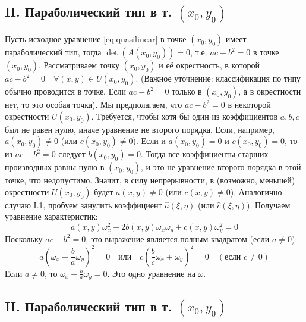 \documentclass[12pt, a4paper]{article}
\begin{document}
\subsection*{II. Параболический тип в т. $(x_0,y_0)$}
Пусть исходное уравнение \eqref{eq:quasilinear} в точке $(x_0,y_0)$ имеет параболический тип, тогда $\det(A(x_0,y_0))=0$, т.е. $ac-b^2=0$ в точке $(x_0,y_0)$.
Рассматриваем точку $(x_0,y_0)$ и её окрестность, в которой $ac-b^2=0 \quad \forall (x,y) \in U(x_0,y_0)$.
(Важное уточнение: классификация по типу обычно проводится в точке. Если $ac-b^2=0$ только в $(x_0,y_0)$, а в окрестности нет, то это особая точка).
Мы предполагаем, что $ac-b^2=0$ в некоторой окрестности $U(x_0,y_0)$.
Требуется, чтобы хотя бы один из коэффициентов $a,b,c$ был не равен нулю, иначе уравнение не второго порядка.
Если, например, $a(x_0,y_0) \neq 0$ (или $c(x_0,y_0) \neq 0$). Если и $a(x_0,y_0)=0$ и $c(x_0,y_0)=0$, то из $ac-b^2=0$ следует $b(x_0,y_0)=0$. Тогда все коэффициенты старших производных равны нулю в $(x_0,y_0)$, и это не уравнение второго порядка в этой точке, что недопустимо.
Значит, в силу непрерывности, в (возможно, меньшей) окрестности $U(x_0,y_0)$ будет $a(x,y) \neq 0$ (или $c(x,y) \neq 0$).
Аналогично случаю I.1, пробуем занулить коэффициент $\hat{a}(\xi,\eta)$ (или $\hat{c}(\xi,\eta)$).
Получаем уравнение характеристик:
\[ a(x,y)\omega_x^2 + 2b(x,y)\omega_x\omega_y + c(x,y)\omega_y^2 = 0 \]
Поскольку $ac-b^2=0$, это выражение является полным квадратом (если $a \neq 0$):
\[ a\left(\omega_x + \frac{b}{a}\omega_y\right)^2 = 0 \quad \text{или} \quad c\left(\frac{b}{c}\omega_x + \omega_y\right)^2 = 0 \quad (\text{если } c \neq 0) \]
Если $a \neq 0$, то $\omega_x + \frac{b}{a}\omega_y = 0$. Это одно уравнение на $\omega$.


\subsection*{II. Параболический тип в т. $(x_0,y_0)$}
\end{document}
